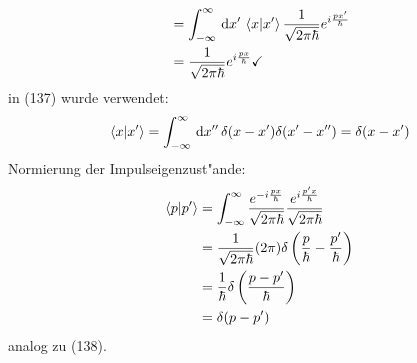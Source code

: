 \documentclass[a4paper]{scrartcl}
\newcommand{\dd}{\ensuremath \, \mathrm{d}}
\begin{document}
{\begin{align}
\begin{split}
& = \int_{-\infty}^\infty \dd x' \, \braket{ x | x'} \frac1{\sqrt{2 \pi \hbar}} e^{i \frac {px'}\hbar} \\
& = \frac1{\sqrt{2\pi\hbar}} e^{i \frac{px}\hbar} \checkmark
\end{split}
\end{align}
in (137) wurde verwendet:
\begin{align}
\braket{x | x'} = \int_{-\infty}^\infty \dd x'' \, \delta(x - x') \delta(x' - x'') = \delta(x - x')
\end{align}
Normierung der Impulseigenzust"ande:
\begin{align}
\begin{split}
\braket{ p | p'} & = \int_{-\infty}^\infty \frac{ e^{- i \frac{px}\hbar}}{\sqrt{2 \pi \hbar}} \frac{e^{ i \frac{p'x}\hbar}}{\sqrt{2 \pi \hbar}} \\
& = \frac1{\sqrt{2\pi\hbar}} (2 \pi) \delta\left( \frac p \hbar - \frac {p'} \hbar \right) \\
& = \frac 1 \hbar \delta \left( \frac{ p - p'} \hbar \right) \\
& = \delta( p - p')
\end{split}
\end{align}
analog zu (138).

}
\end{document}
